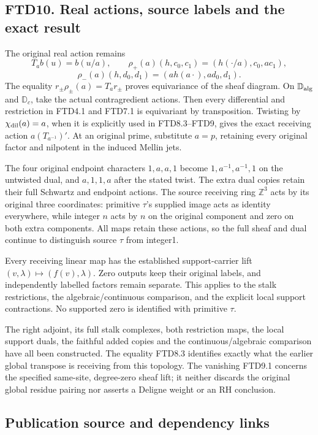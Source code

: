 \subsection{FTD10. Real actions, source labels and the exact
result}\label{ftd10.-real-actions-source-labels-and-the-exact-result}

The original real action remains \[
T_ab(u)=b(u/a),\qquad
\rho_+(a)(h,c_0,c_1)=(h(\cdot/a),c_0,ac_1),
\] \[
\rho_-(a)(h,d_0,d_1)=(a h(a\cdot),ad_0,d_1).
\] The equality \(r_\pm\rho_\pm(a)=T_ar_\pm\) proves equivariance of the
sheaf diagram. On \(\mathbb D_{\rm alg}\) and \(\mathbb D_c\), take the
actual contragredient actions. Then every differential and restriction
in FTD4.1 and FTD7.1 is equivariant by transposition. Twisting by
\(\chi_{\rm dil}(a)=a\), when it is explicitly used in FTD8.3--FTD9,
gives the exact receiving action \(a(T_{a^{-1}})'\). At an original
prime, substitute \(a=p\), retaining every original factor and nilpotent
in the induced Mellin jets.

The four original endpoint characters \(1,a,a,1\) become
\(1,a^{-1},a^{-1},1\) on the untwisted dual, and \(a,1,1,a\) after the
stated twist. The extra dual copies retain their full Schwartz and
endpoint actions. The source receiving ring \(\mathbb Z^3\) acts by its
original three coordinates: primitive \(\tau\)'s supplied image acts as
identity everywhere, while integer \(n\) acts by \(n\) on the original
component and zero on both extra components. All maps retain these
actions, so the full sheaf and dual continue to distinguish source
\(\tau\) from integer1.

Every receiving linear map has the established support-carrier lift
\((v,\lambda)\mapsto(f(v),\lambda)\). Zero outputs keep their original
labels, and independently labelled factors remain separate. This applies
to the stalk restrictions, the algebraic/continuous comparison, and the
explicit local support contractions. No supported zero is identified
with primitive \(\tau\).

The right adjoint, its full stalk complexes, both restriction maps, the
local support duals, the faithful added copies and the
continuous/algebraic comparison have all been constructed. The equality
FTD8.3 identifies exactly what the earlier global transpose is receiving
from this topology. The vanishing FTD9.1 concerns the specified
same-site, degree-zero sheaf lift; it neither discards the original
global residue pairing nor asserts a Deligne weight or an RH conclusion.

\subsection{Publication source and dependency
links}\label{publication-source-and-dependency-links}

